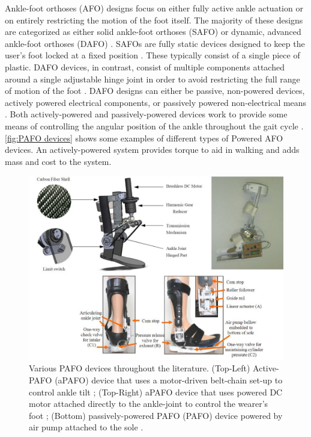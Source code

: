 Ankle-foot orthoses (AFO) designs focus on either fully active ankle actuation or on entirely restricting the motion of the foot itself.  The majority of these designs are categorized as either solid ankle-foot orthoses (SAFO) or dynamic, advanced ankle-foot orthoses (DAFO) \cite{poweredAFOChina2012_6308213}. SAFOs are fully static devices designed to keep the user's foot locked at a fixed position \cite{staticAFO_6610673}.  These typically consist of a single piece of plastic.  DAFO devices, in contrast, consist of multiple components attached around a single adjustable hinge joint in order to avoid restricting the full range of motion of the foot \cite{poweredAFOChina2012_6308213}.  DAFO designs can either be passive, non-powered devices, actively powered electrical components, or passively powered non-electrical means \cite{RussellEsposito2018}. Both actively-powered and passively-powered devices work to provide some means of controlling the angular position of the ankle throughout the gait cycle \cite{poweredAFOChina2012_6308213} \cite{actAFOFricCTRL} \cite{pneumaticAFO2009}. \autoref{fig:PAFO devices} shows some examples of different types of Powered AFO devices. An actively-powered system provides torque to aid in walking and adds mass and cost to the system.

\begin{figure}[h!]
    \centering
    \includegraphics[scale=0.30]{images/background/PAFO_designs.JPG}
    \caption[Active v. Passive PAFO]{Various PAFO devices throughout the literature. (Top-Left) Active-PAFO (aPAFO) device that uses a motor-driven belt-chain set-up to control ankle tilt \cite{poweredAFOChina2012_6308213};  (Top-Right) aPAFO device that uses powered DC motor attached directly to the ankle-joint to control the wearer's foot \cite{actAFOFricCTRL};  (Bottom) passively-powered PAFO (PAFO) device powered by air pump attached to the sole \cite{pneumaticAFO2009}.}
    \label{fig:PAFO devices}
\end{figure} 


